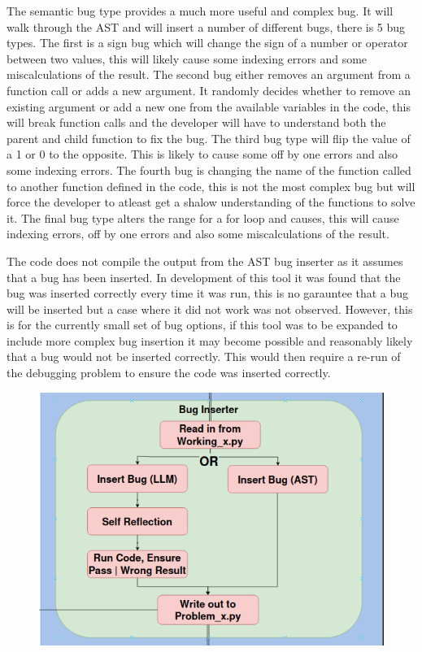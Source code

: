 \documentclass[12pt]{extarticle}
\begin{document}
The semantic bug type provides a much more useful and complex bug. It will walk through the AST and will insert a number of different bugs, there is 5 bug types. The first is a sign bug which will change the sign of a number or operator between two values, this will likely cause some indexing errors and some miscalculations of the result. The second bug either removes an argument from a function call or adds a new argument. It randomly decides whether to remove an existing argument or add a new one from the available variables in the code, this will break function calls and the developer will have to understand both the parent and child function to fix the bug. The third bug type will flip the value of a 1 or 0 to the opposite. This is likely to cause some off by one errors and also some indexing errors. The fourth bug is changing the name of the function called to another function defined in the code, this is not the most complex bug but will force the developer to atleast get a shalow understanding of the functions to solve it. The final bug type alters the range for a for loop and causes, this will cause indexing errors, off by one errors and also some miscalculations of the result.

The code does not compile the output from the AST bug inserter as it assumes that a bug has been inserted. In development of this tool it was found that the bug was inserted correctly every time it was run, this is no garauntee that a bug will be inserted but a case where it did not work was not observed. However, this is for the currently small set of bug options, if this tool was to be expanded to include more complex bug insertion it may become possible and reasonably likely that a bug would not be inserted correctly. This would then require a re-run of the debugging problem to ensure the code was inserted correctly.

\begin{figure}[H]
\centering
\includegraphics[width=0.7\linewidth]{Images/Bug_Inserter.png}
\label{fig:bug_inserter}
\end{figure}
\end{document}
